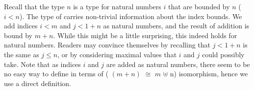 Recall that the type  $n$ is a type for natural numbers $i$ that
are bounded by $n$ (\ie{} $i < n$).  The type of  carries non-trivial
information about the index bounds.  We
add indices $i < m$ and $j < 1 + n$ as natural numbers, and the result of
addition is bound by $m + n$.  While this might be a little surprising, this
indeed holds for natural numbers.  Readers may convince themselves by
recalling that $j < 1 + n$ is the same as $j \le n$, or by considering
maximal values that $i$ and $j$ could possibly take.
Note that as indices $i$ and $j$ are added as natural numbers, there seem to be
no easy way to define  in terms of ( $(m + n)$ $\cong$
 $m$ $⊎$  n) isomorphism, hence we use a direct definition.

